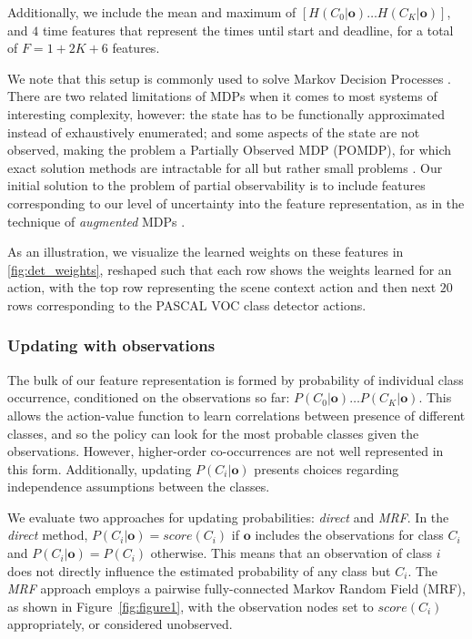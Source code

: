 Additionally, we include the mean and maximum of $[H(C_0|\mathbf{o}) \ldots H(C_K|\mathbf{o})]$, and $4$ time features that represent the times until start and deadline, for a total of $F = 1+2K+6$ features.

We note that this setup is commonly used to solve Markov Decision Processes \cite{Sutton1998}.
There are two related limitations of MDPs when it comes to most systems of interesting complexity, however: the state has to be functionally approximated instead of exhaustively enumerated; and some aspects of the state are not observed, making the problem a Partially Observed MDP (POMDP), for which exact solution methods are intractable for all but rather small problems \cite{Roy2002}.
Our initial solution to the problem of partial observability is to include features corresponding to our level of uncertainty into the feature representation, as in the technique of \emph{augmented} MDPs \cite{Kwok2004}.



As an illustration, we visualize the learned weights on these features in \autoref{fig:det_weights}, reshaped such that each row shows the weights learned for an action, with the top row representing the scene context action and then next $20$ rows corresponding to the PASCAL VOC class detector actions.

\subsubsection{Updating with observations}\label{sec:det_features_updating}

The bulk of our feature representation is formed by probability of individual class occurrence, conditioned on the observations so far: $P(C_0|\mathbf{o}) \ldots P(C_K|\mathbf{o})$.
This allows the action-value function to learn correlations between presence of different classes, and so the policy can look for the most probable classes given the observations.
However, higher-order co-occurrences are not well represented in this form.
Additionally, updating $P(C_i|\mathbf{o})$ presents choices regarding independence assumptions between the classes.

We evaluate two approaches for updating probabilities: \emph{direct} and \emph{MRF}.
In the \emph{direct} method, $P(C_i|\mathbf{o}) = score(C_i)$ if $\mathbf{o}$ includes the observations for class $C_i$ and $P(C_i|\mathbf{o}) = P(C_i)$ otherwise.
This means that an observation of class $i$ does not directly influence the estimated probability of any class but $C_i$.
The \emph{MRF} approach employs a pairwise fully-connected Markov Random Field (MRF), as shown in Figure~\ref{fig:figure1}, with the observation nodes set to $score(C_i)$ appropriately, or considered unobserved.


